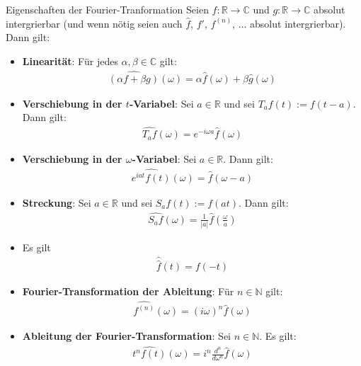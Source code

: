 \documentclass[a4paper,10pt]{article}
\begin{document}
\begin{mainbox}{Eigenschaften der Fourier-Tranformation}
  Seien \(f\colon\mathbb{R}\to\mathbb{C}\) und \(g\colon\mathbb{R}\to\mathbb{C}\) absolut intergrierbar (und wenn nötig seien auch \(\hat{f}\), \(f'\), \(f^{( n )}\), \(\dots\) absolut intergrierbar). Dann gilt:
  \begin{itemize}
    \item{
      \textbf{Linearität}: Für jedes \(\alpha,\beta \in \mathbb{C}\) gilt: \begin{align*} \widehat{(\alpha f + \beta g)}(\omega ) = \alpha \hat{f}(\omega ) + \beta \hat{g}(\omega ) \end{align*}
    }
    \item{
      \textbf{Verschiebung in der \(t\)-Variabel}: Sei \(a \in \mathbb{R}\) und sei \(T_af(t):=f(t-a)\). Dann gilt: \begin{align*} \widehat{T_af}(\omega ) = e^{- i \omega a} \hat{f}(\omega )  \end{align*}
    }
    \item{
      \textbf{Verschiebung in der \(\omega\)-Variabel}: Sei \(a \in \mathbb{R}\). Dann gilt: \begin{align*} \widehat{e^{ i at} f(t)}(\omega ) = \hat{f}(\omega -a) \end{align*}
    }
    \item{
      \textbf{Streckung}: Sei \(a\in\mathbb{R}\) und sei \(S_af(t):=f(at)\). Dann gilt: \begin{align*} \widehat{S_af}(\omega ) = \frac{1}{|a|} \hat{f}\left(\frac{\omega }{a}\right) \end{align*}
    }
    \item{
      Es gilt \begin{align*} \hat{\hat{f}}(t) = f(-t) \end{align*}
    }
    \item{
      \textbf{Fourier-Transformation der Ableitung}: Für \(n\in\mathbb{N}\) gilt: \begin{align*} \widehat{f^{( n )}}(\omega ) = ( i \omega )^n \hat{f}(\omega ) \end{align*}
    }
    \item{
      \textbf{Ableitung der Fourier-Transformation}: Sei \(n\in\mathbb{N}\). Es gilt: \begin{align*} \widehat{t^n f(t)}(\omega ) = i^n \frac{d^n}{d\omega ^n} \hat{f}(\omega ) \end{align*}
    }
  \end{itemize}
\end{mainbox}
\end{document}
